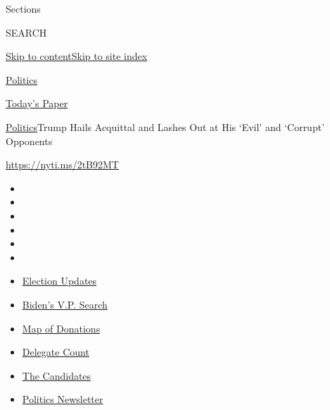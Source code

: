 Sections

SEARCH

\protect\hyperlink{site-content}{Skip to
content}\protect\hyperlink{site-index}{Skip to site index}

\href{https://www.nytimes.com/section/politics}{Politics}

\href{https://myaccount.nytimes.com/auth/login?response_type=cookie\&client_id=vi}{}

\href{https://www.nytimes.com/section/todayspaper}{Today's Paper}

\href{/section/politics}{Politics}\textbar{}Trump Hails Acquittal and
Lashes Out at His `Evil' and `Corrupt' Opponents

\url{https://nyti.ms/2tB92MT}

\begin{itemize}
\item
\item
\item
\item
\item
\item
\end{itemize}

\begin{itemize}
\item
  \href{https://www.nytimes.com/2020/07/31/us/elections/biden-vs-trump.html?action=click\&pgtype=Article\&state=default\&region=TOP_BANNER\&context=storylines_menu}{Election
  Updates}
\item
  \href{https://www.nytimes.com/article/biden-vice-president-2020.html?action=click\&pgtype=Article\&state=default\&region=TOP_BANNER\&context=storylines_menu}{Biden's
  V.P. Search}
\item
  \href{https://www.nytimes.com/interactive/2020/07/24/us/politics/trump-biden-campaign-donors.html?action=click\&pgtype=Article\&state=default\&region=TOP_BANNER\&context=storylines_menu}{Map
  of Donations}
\item
  \href{https://www.nytimes.com/interactive/2020/us/elections/delegate-count-primary-results.html?action=click\&pgtype=Article\&state=default\&region=TOP_BANNER\&context=storylines_menu}{Delegate
  Count}
\item
  \href{https://www.nytimes.com/interactive/2019/us/politics/2020-presidential-candidates.html?action=click\&pgtype=Article\&state=default\&region=TOP_BANNER\&context=storylines_menu}{The
  Candidates}
\item
  \href{https://www.nytimes.com/newsletters/politics?action=click\&pgtype=Article\&state=default\&region=TOP_BANNER\&context=storylines_menu}{Politics
  Newsletter}
\end{itemize}


